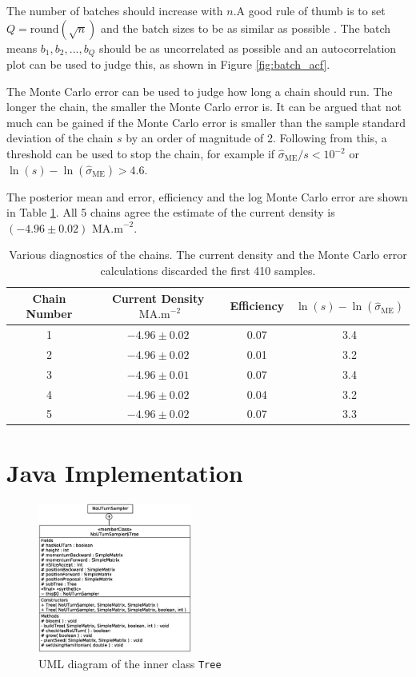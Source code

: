 \documentclass[10pt]{proc}
\newcommand{\dotdotdot}{...}
\begin{document}
The number of batches should increase with $n$.A good rule of thumb is to set $Q=\text{round}(\sqrt{n})$ and the batch sizes to be as similar as possible \citep{jones2006fixed}. The batch means $b_1,b_2,\dotdotdot,b_Q$ should be as uncorrelated as possible and an autocorrelation plot can be used to judge this, as shown in Figure \ref{fig:batch_acf}. 

The Monte Carlo error can be used to judge how long a chain should run. The longer the chain, the smaller the Monte Carlo error is. It can be argued that not much can be gained if the Monte Carlo error is smaller than the sample standard deviation of the chain $s$ by an order of magnitude of 2. Following from this, a threshold can be used to stop the chain, for example if $\widehat{\sigma}_{\text{ME}}/s<10^{-2}$ or $\ln(s)-\ln(\widehat{\sigma}_{\text{ME}}) > 4.6$.

The posterior mean and error, efficiency and the log Monte Carlo error are shown in Table \ref{table:diagnostic}. All 5 chains agree the estimate of the current density is $(-4.96 \pm 0.02) \text{ MA.m}^{-2}$.

\begin{table}[htp]
\centering
\begin{tabular}{c|c|c|c}
Chain Number & Current Density $\text{ MA.m}^{-2}$ & Efficiency & $\ln(s)-\ln(\widehat{\sigma}_{\text{ME}})$ \\
\hline
1 & $-4.96 \pm 0.02$ & 0.07 & 3.4\\
2 & $-4.96 \pm 0.02$ & 0.01 & 3.2\\
3 & $-4.96 \pm 0.01$ & 0.07 & 3.4\\
4 & $-4.96 \pm 0.02$ & 0.04 & 3.2\\
5 & $-4.96 \pm 0.02$ & 0.07 & 3.3\\
\end{tabular}
\caption{Various diagnostics of the chains. The current density and the Monte Carlo error calculations discarded the first 410 samples.}
\label{table:diagnostic}
\end{table}

\section{Java Implementation}

\begin{figure}[ht]
  \centering
  \includegraphics[width=0.45\textwidth]{NoUTurnSampler.eps}
  \caption{UML diagram of the inner class \texttt{Tree}}
  \label{fig:tree_uml}
\end{figure}
\end{document}
